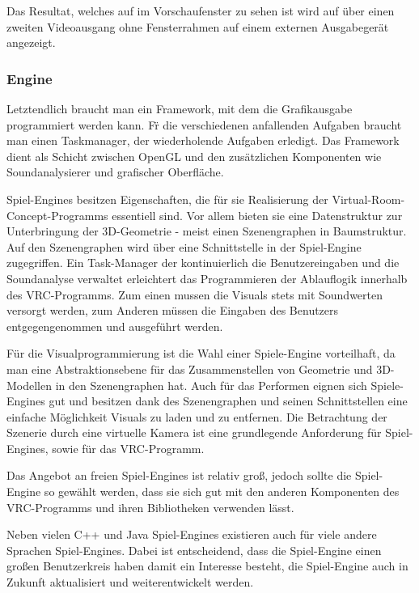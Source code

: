 Das Resultat, welches auf im Vorschaufenster zu sehen ist wird auf \"uber einen zweiten Videoausgang ohne Fensterrahmen auf
einem externen Ausgabeger\"at angezeigt.


\subsubsection{Engine}

Letztendlich braucht man ein Framework, mit dem die Grafikausgabe programmiert werden kann. F\"r die verschiedenen anfallenden
Aufgaben braucht man einen Taskmanager, der wiederholende Aufgaben erledigt. Das Framework dient als Schicht zwischen OpenGL
und den zus\"atzlichen Komponenten wie Soundanalysierer und grafischer Oberfl\"ache.

Spiel-Engines besitzen Eigenschaften, die f\"ur sie Realisierung der Virtual-Room-Concept-Programms essentiell sind. Vor
allem bieten sie eine Datenstruktur zur Unterbringung der 3D-Geometrie - meist einen Szenengraphen in Baumstruktur.
Auf den Szenengraphen wird \"uber eine Schnittstelle in der Spiel-Engine zugegriffen. Ein Task-Manager der kontinuierlich
die Benutzereingaben und die Soundanalyse verwaltet erleichtert das Programmieren der Ablauflogik innerhalb des VRC-Programms.
Zum einen mussen die Visuals stets mit Soundwerten versorgt werden, zum Anderen m\"ussen die Eingaben des Benutzers
entgegengenommen und ausgef\"uhrt werden.

F\"ur die Visualprogrammierung ist die Wahl einer Spiele-Engine vorteilhaft, da man eine Abstraktionsebene f\"ur das 
Zusammenstellen von Geometrie und 3D-Modellen in den Szenengraphen hat. 
Auch f\"ur das Performen eignen sich Spiele-Engines gut und besitzen dank des 
Szenengraphen und seinen Schnittstellen eine einfache M\"oglichkeit Visuals zu laden und zu entfernen. Die Betrachtung 
der Szenerie durch eine virtuelle Kamera ist eine grundlegende Anforderung f\"ur Spiel-Engines, sowie f\"ur das
VRC-Programm.

Das Angebot an freien Spiel-Engines ist relativ gro\ss{}, jedoch sollte die Spiel-Engine so gew\"ahlt werden, dass sie
sich gut mit den anderen  Komponenten des VRC-Programms und ihren Bibliotheken verwenden l\"asst. 

Neben vielen C++ und Java Spiel-Engines existieren auch f\"ur viele andere Sprachen Spiel-Engines. Dabei ist entscheidend,
dass die Spiel-Engine einen gro\ss{}en Benutzerkreis haben damit ein Interesse besteht, die Spiel-Engine auch in Zukunft
aktualisiert und weiterentwickelt werden.

